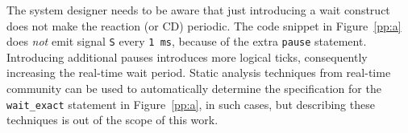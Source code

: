 The system designer needs to be aware that just introducing a wait
construct does not make the reaction (or CD) periodic. The code snippet
in Figure~\ref{pp:a} does \textit{not} emit signal \texttt{S} every
\texttt{1 ms}, because of the extra \texttt{pause} statement.
Introducing additional pauses introduces more logical ticks,
consequently increasing the real-time wait period. Static analysis
techniques from real-time community can be used to automatically
determine the specification for the \texttt{wait\_exact} statement in
Figure~\ref{pp:a}, in such cases, but describing these techniques is out
of the scope of this work.


